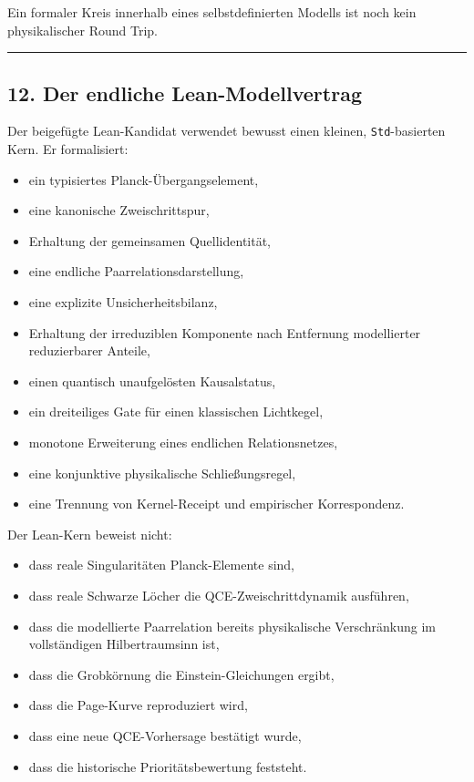 \documentclass[
  11pt,
  a4paper,
]{article}
\providecommand{\tightlist}{%
  \setlength{\itemsep}{0pt}\setlength{\parskip}{0pt}}
\begin{document}
Ein formaler Kreis innerhalb eines selbstdefinierten Modells ist noch
kein physikalischer Round Trip.

\begin{center}\rule{0.5\linewidth}{0.5pt}\end{center}

\subsection{12. Der endliche
Lean-Modellvertrag}\label{der-endliche-lean-modellvertrag}

Der beigefügte Lean-Kandidat verwendet bewusst einen kleinen,
\texttt{Std}-basierten Kern. Er formalisiert:

\begin{itemize}
\tightlist
\item
  ein typisiertes Planck-Übergangselement,
\item
  eine kanonische Zweischrittspur,
\item
  Erhaltung der gemeinsamen Quellidentität,
\item
  eine endliche Paarrelationsdarstellung,
\item
  eine explizite Unsicherheitsbilanz,
\item
  Erhaltung der irreduziblen Komponente nach Entfernung modellierter
  reduzierbarer Anteile,
\item
  einen quantisch unaufgelösten Kausalstatus,
\item
  ein dreiteiliges Gate für einen klassischen Lichtkegel,
\item
  monotone Erweiterung eines endlichen Relationsnetzes,
\item
  eine konjunktive physikalische Schließungsregel,
\item
  eine Trennung von Kernel-Receipt und empirischer Korrespondenz.
\end{itemize}

Der Lean-Kern beweist nicht:

\begin{itemize}
\tightlist
\item
  dass reale Singularitäten Planck-Elemente sind,
\item
  dass reale Schwarze Löcher die QCE-Zweischrittdynamik ausführen,
\item
  dass die modellierte Paarrelation bereits physikalische Verschränkung
  im vollständigen Hilbertraumsinn ist,
\item
  dass die Grobkörnung die Einstein-Gleichungen ergibt,
\item
  dass die Page-Kurve reproduziert wird,
\item
  dass eine neue QCE-Vorhersage bestätigt wurde,
\item
  dass die historische Prioritätsbewertung feststeht.
\end{itemize}
\end{document}
